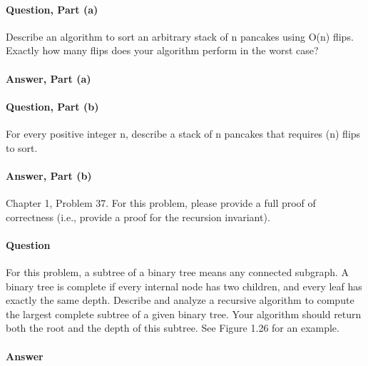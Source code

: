 \documentclass{article}
\begin{document}
\paragraph{Question, Part (a)}{Describe an algorithm to sort an arbitrary stack of n pancakes using O(n) flips. Exactly how many flips does your algorithm perform in the worst case?}
\paragraph{Answer, Part (a)}
\todo{}

\paragraph{Question, Part (b)}{For every positive integer n, describe a stack of n pancakes that requires (n) flips to sort.}
\paragraph{Answer, Part (b)}

\todo{}

\collab{\todo{}}

Chapter 1, Problem 37.  For this problem, please provide a full proof of
correctness (i.e., provide a proof for the recursion invariant).

\paragraph{Question}{For this problem, a subtree of a binary tree means any connected subgraph.
A binary tree is complete if every internal node has two children, and every
leaf has exactly the same depth. Describe and analyze a recursive algorithm
to compute the largest complete subtree of a given binary tree. Your algorithm
should return both the root and the depth of this subtree. See Figure 1.26
for an example.}

\paragraph{Answer}
\todo{}
\end{document}
